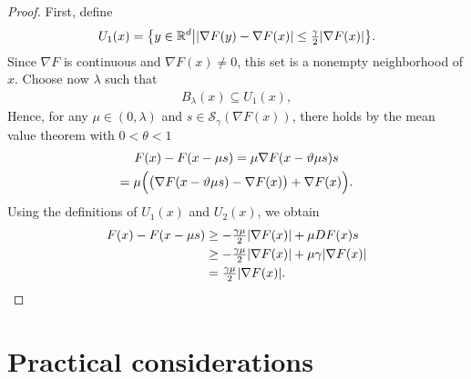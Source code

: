 \begin{proof}
  First, define
  \begin{gather*}
    U_1(x) = \bigl\{ y\in \R^d \big\vert \abs{\nabla F(y)-\nabla F(x)}
    \le \tfrac{\gamma}{2} \abs{\nabla F(x)}\bigr\}.
  \end{gather*}
  Since $\nabla F$ is continuous and $\nabla F(x) \neq 0$, this set is
  a nonempty neighborhood of $x$.
Choose now $\lambda$ such that
  \begin{gather*}
    B_{\lambda}(x) \subseteq U_1(x),%
  \end{gather*}
  Hence, for any $\mu\in(0,\lambda)$ and
  $s\in \mathcal S_\gamma(\nabla F(x))$, there holds by the mean value
  theorem with $0<\theta<1$
  \begin{multline*}
    F(x)-F(x-\mu s) = \mu \nabla F(x-\theta\mu s)s \\
    = \mu \Bigl(\bigl(\nabla F(x-\theta\mu s) - \nabla F(x)\bigr)
    +\nabla F(x)\Bigr).
  \end{multline*}
  Using the definitions of $U_1(x)$ and $U_2(x)$, we obtain
  \begin{align*}
    F(x)-F(x-\mu s)
    &\ge -\tfrac{\gamma\mu}{2}\abs{\nabla F(x)}
      + \mu DF(x)s\\
    &\ge -\tfrac{\gamma\mu}{2}\abs{\nabla F(x)}
      + \mu\gamma\abs{\nabla F(x)}\\
    &= \tfrac{\gamma\mu}{2}\abs{\nabla F(x)}.
  \end{align*}
\end{proof}

\section{Practical considerations}

